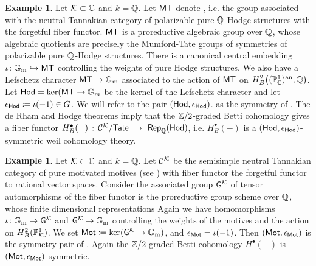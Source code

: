\documentclass[twoside,leqno]{article}
\numberwithin{equation}{section}
\theoremstyle{plain}
\theoremstyle{definition}
\newtheorem{example}[equation]{Example}
\begin{document}
\begin{example} \label{ex:Z/2Hodge}
    Let $\mathcal K \subset \mathbb C$  and $k = \mathbb Q$. Let $\mathsf{MT}$ denote  \cite{DeligneMilne,milne-MT}, i.e. the group associated with the neutral Tannakian category of polarizable pure $\mathbb Q$-Hodge structures with the forgetful fiber functor. $\mathsf{MT}$ is a proreductive algebraic group over $\mathbb Q$,  whose algebraic quotients are precisely the Mumford-Tate groups of symmetries of polarizable pure $\mathbb Q$-Hodge structures. There is a canonical central embedding $\iota\colon \mathbb G_\mathrm{m} \hookrightarrow \mathsf{MT}$ controlling the weights of pure Hodge structures.
    We also have a Lefschetz character $\mathsf{MT} \to \mathbb G_\mathrm{m}$ associated to the action of $\mathsf{MT}$ on $H^2_{B}\big((\mathbb P^1_{\mathbb C})^{\operatorname{an}},\mathbb Q\big)$.
    Let $\mathsf{Hod} = \ker(\mathsf{MT} \to \mathbb{G}_{m}$ be the kernel of the Lefschetz character and let $\epsilon_{\mathsf{Hod}} \coloneqq \iota(-1) \in G$. We will refer to the pair  $(\mathsf{Hod},\epsilon_{\mathsf{Hod}})$.
    as the symmetry of . The de Rham and  Hodge theorems imply that  the $\mathbb Z/2$-graded Betti  cohomology  gives a fiber functor $H^{\bullet}_{B}(-) \, : \, \mathcal{C}^{\mathcal K}/\mathsf{Tate} \ \to \ \mathsf{Rep}_{\mathbb Q}(\mathsf{Hod})$, i.e. $H^{\bullet}_{B}(-)$ is a 
    $(\mathsf{Hod},\epsilon_{\mathsf{Hod}})$-symmetric weil cohomology theory. 
\end{example}

\begin{example} \label{ex:MotM}
    Let $\mathcal K \subset \mathbb C$ and $k = \mathbb Q$.
    Let $\mathcal{C}^{\mathcal K}$ be the semisimple neutral Tannakian category of pure motivated motives (see \cite{Andre_Pour_une_theorie_inconditionnelle_des_motifs,Andre-book}) with fiber functor the forgetful functor to rational vector spaces. Consider the associated group $\mathsf{G}^{\mathcal K}$ of tensor automorphisms of the fiber functor is the proreductive group scheme over $\mathbb Q$, whose finite dimensional representations
    Again we have homomorphisms $\iota \colon \mathbb G_\mathrm{m} \to \mathsf{G}^{\mathcal K}$ and $\mathsf{G}^{\mathcal K} \to \mathbb G_\mathrm{m}$ controlling the weights of the motives and the action on  $H^{2}_{B}(\mathbb P^1_{\mathcal K})$. We set $\mathsf{Mot} \coloneqq \ker(\mathsf{G}^{\mathcal K} \to \mathbb G_\mathrm{m})$, and $\epsilon_{\mathsf{Mot}} = \iota(-1)$. Then $\left(\mathsf{Mot},\epsilon_{\mathsf{Mot}}\right)$ is the symmetry pair of  . Again the $\mathbb Z/2$-graded Betti cohomology $H^{\bullet}(-)$  is     $\left(\mathsf{Mot},\epsilon_{\mathsf{Mot}}\right)$-symmetric.
\end{example}
\end{document}
